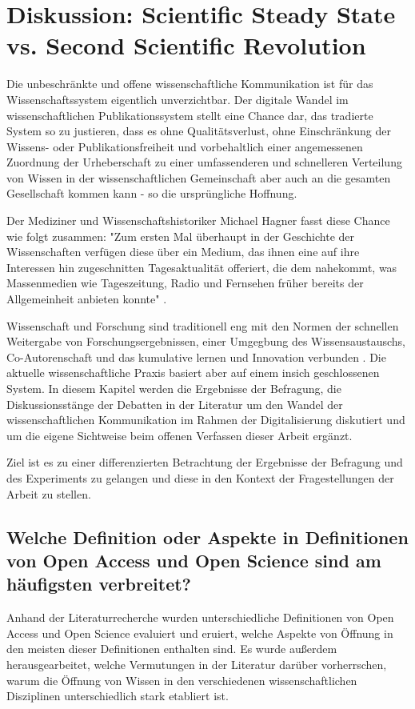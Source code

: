 \chapter{Diskussion: Scientific Steady State vs. Second Scientific Revolution}

Die unbeschränkte und offene wissenschaftliche Kommunikation ist für das Wissenschaftssystem eigentlich unverzichtbar. Der digitale Wandel im wissenschaftlichen Publikationssystem stellt eine Chance dar, das tradierte System so zu justieren, dass es ohne Qualitätsverlust, ohne Einschränkung der Wissens- oder Publikationsfreiheit und vorbehaltlich einer angemessenen Zuordnung der Urheberschaft zu einer umfassenderen und schnelleren Verteilung von Wissen in der wissenschaftlichen Gemeinschaft aber auch an die gesamten Gesellschaft kommen kann - so die ursprüngliche Hoffnung.

Der Mediziner und Wissenschaftshistoriker Michael Hagner fasst diese Chance wie folgt zusammen: "Zum ersten Mal überhaupt in der Geschichte der Wissenschaften verfügen diese über ein Medium, das ihnen eine auf ihre Interessen hin zugeschnitten Tagesaktualität offeriert, die dem nahekommt, was Massenmedien wie Tageszeitung, Radio und Fernsehen früher bereits der Allgemeinheit anbieten konnte" \cite{hagner_2015_sache_buches}.

Wissenschaft und Forschung sind traditionell eng mit den Normen der schnellen Weitergabe von Forschungsergebnissen, einer Umgegbung des Wissensaustauschs, Co-Autorenschaft und das kumulative lernen und Innovation verbunden \cite{Partha_1994_economics_science}. Die aktuelle wissenschaftliche Praxis basiert aber auf einem insich geschlossenen System. In diesem Kapitel werden die Ergebnisse der Befragung, die Diskussionsstänge der Debatten in der Literatur um den Wandel der wissenschaftlichen Kommunikation im Rahmen der Digitalisierung diskutiert und um die eigene Sichtweise beim offenen Verfassen dieser Arbeit ergänzt.

Ziel ist es zu einer differenzierten Betrachtung der Ergebnisse der Befragung und des Experiments zu gelangen und diese in den Kontext der Fragestellungen der Arbeit zu stellen.

\section{Welche Definition oder Aspekte in Definitionen von Open Access und Open Science sind am häufigsten verbreitet?}

Anhand der Literaturrecherche wurden unterschiedliche Definitionen von Open Access und Open Science evaluiert und eruiert, welche Aspekte von Öffnung in den meisten dieser Definitionen enthalten sind. Es wurde außerdem herausgearbeitet, welche Vermutungen in der Literatur darüber vorherrschen, warum die Öffnung von Wissen in den verschiedenen wissenschaftlichen Disziplinen unterschiedlich stark etabliert ist.

